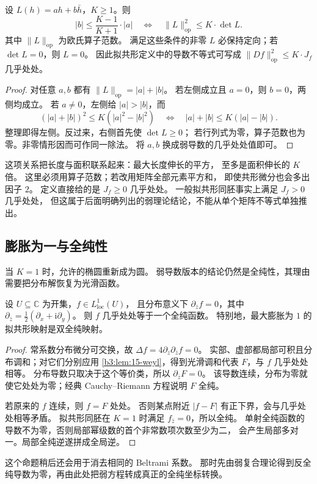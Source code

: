 \begin{proposition}[轴比与能量形式]\label{b3:prop:B-energy-distortion}
设 \(L(h)=ah+b\bar h\)，\(K\ge1\)。则
\[
 |b|\le\frac{K-1}{K+1}\cdot|a|
 \quad\Longleftrightarrow\quad
 \|L\|_{\mathrm{op}}^2\le K\cdot\det L.
\]
其中 \(\|L\|_{\mathrm{op}}\) 为欧氏算子范数。
满足这些条件的非零 \(L\) 必保持定向；若 \(\det L=0\)，则 \(L=0\)。
因此拟共形定义中的导数不等式可写成
\(\|Df\|_{\mathrm{op}}^2\le K\cdot J_f\) 几乎处处。
\end{proposition}
\begin{proof}
对任意 \(a,b\) 都有 \(\|L\|_{\mathrm{op}}=|a|+|b|\)。
若左侧成立且 \(a=0\)，则 \(b=0\)，两侧均成立。
若 \(a\ne0\)，左侧给 \(|a|>|b|\)，而
\[
 (|a|+|b|)^2\le K(|a|^2-|b|^2)
 \quad\Longleftrightarrow\quad
 |a|+|b|\le K(|a|-|b|).
\]
整理即得左侧。反过来，右侧首先使 \(\det L\ge0\)；
若行列式为零，算子范数也为零。非零情形因而可作同一除法。
将 \(a,b\) 换成弱导数的几乎处处值即可。
\end{proof}
这项关系把长度与面积联系起来：最大长度伸长的平方，
至多是面积伸长的 \(K\) 倍。
这里必须用算子范数；若改用矩阵全部元素平方和，
即使共形微分也会多出因子 \(2\)。
定义直接给的是 \(J_f\ge0\) 几乎处处。
一般拟共形同胚事实上满足 \(J_f>0\) 几乎处处，
但这属于后面明确列出的弱理论结论，不能从单个矩阵不等式单独推出。

\subsection{膨胀为一与全纯性}
\label{b3:subsec:B0103}

当 \(K=1\) 时，允许的椭圆重新成为圆。
弱导数版本的结论仍然是全纯性，其理由需要把分布解恢复为光滑函数。

\begin{proposition}\label{b3:prop:B-weak-cr}
设 \(U\subseteq\mathbb C\) 为开集，\(f\in L^1_{\mathrm{loc}}(U)\)，
且分布意义下 \(\partial_{\bar z}f=0\)，其中
\(\partial_{\bar z}=\tfrac12(\partial_x+\mathrm i\partial_y)\)。
则 \(f\) 几乎处处等于一个全纯函数。
特别地，最大膨胀为 \(1\) 的拟共形映射是双全纯映射。
\end{proposition}
\begin{proof}
常系数分布微分可交换，故
\(\Delta f=4\partial_z\partial_{\bar z}f=0\)。
实部、虚部都局部可积且分布调和；对它们分别应用
\cref{b3:lem:15-weyl}，得到光滑调和代表 \(F\)，与 \(f\) 几乎处处相等。
分布导数只取决于这个等价类，所以 \(\partial_{\bar z}F=0\)。
该导数连续，分布为零就使它处处为零；经典 Cauchy--Riemann 方程说明 \(F\) 全纯。

若原来的 \(f\) 连续，则 \(f=F\) 处处。
否则某点附近 \(|f-F|\) 有正下界，会与几乎处处相等矛盾。
拟共形同胚在 \(K=1\) 时满足 \(f_{\bar z}=0\)，所以全纯。
单射全纯函数的导数不为零，否则局部幂级数的首个非常数项次数至少为二，
会产生局部多对一。局部全纯逆遂拼成全局逆。
\end{proof}
这个命题稍后还会用于消去相同的 Beltrami 系数。
那时先由弱复合理论得到反全纯导数为零，再由此处把弱方程转成真正的全纯坐标转换。

